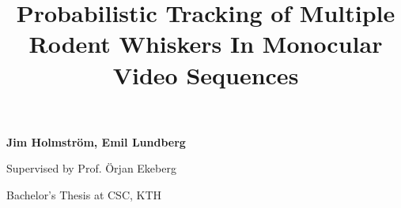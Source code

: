 \documentclass{article}
\begin{document}
\title{\bf Probabilistic Tracking of Multiple Rodent Whiskers In Monocular Video Sequences}

\date{}
\maketitle
\thispagestyle{empty}
\pagestyle{empty}

{\bf Jim Holmström, \; Emil Lundberg}

Supervised by Prof. Örjan Ekeberg

Bachelor's Thesis at CSC, KTH











{}

\end{document}
